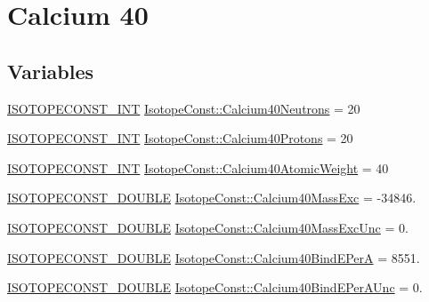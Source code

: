 \hypertarget{group___isotope_const-_calcium-_ca40}{}\section{Calcium 40}
\label{group___isotope_const-_calcium-_ca40}
\subsection*{Variables}
\begin{DoxyCompactItemize}
\item 
\mbox{\hyperlink{group___isotope_const-_macros_ga5f18360b3e99483a35c32d789e62621c}{I\+S\+O\+T\+O\+P\+E\+C\+O\+N\+S\+T\+\_\+\+I\+NT}} \mbox{\hyperlink{group___isotope_const-_calcium-_ca40_ga3960d94a6b2493802536466a374dfe0c}{Isotope\+Const\+::\+Calcium40\+Neutrons}} = 20
\item 
\mbox{\hyperlink{group___isotope_const-_macros_ga5f18360b3e99483a35c32d789e62621c}{I\+S\+O\+T\+O\+P\+E\+C\+O\+N\+S\+T\+\_\+\+I\+NT}} \mbox{\hyperlink{group___isotope_const-_calcium-_ca40_ga872fcb7995c634f64b32d61a42a71a38}{Isotope\+Const\+::\+Calcium40\+Protons}} = 20
\item 
\mbox{\hyperlink{group___isotope_const-_macros_ga5f18360b3e99483a35c32d789e62621c}{I\+S\+O\+T\+O\+P\+E\+C\+O\+N\+S\+T\+\_\+\+I\+NT}} \mbox{\hyperlink{group___isotope_const-_calcium-_ca40_ga2e5cabd8fe78b87970ab024e37f44fc2}{Isotope\+Const\+::\+Calcium40\+Atomic\+Weight}} = 40
\item 
\mbox{\hyperlink{group___isotope_const-_macros_ga8f45a7272ce02c0b4c65c44636ed719a}{I\+S\+O\+T\+O\+P\+E\+C\+O\+N\+S\+T\+\_\+\+D\+O\+U\+B\+LE}} \mbox{\hyperlink{group___isotope_const-_calcium-_ca40_ga1d5a467a09d61b43cd91f2252be3d392}{Isotope\+Const\+::\+Calcium40\+Mass\+Exc}} = -\/34846.
\item 
\mbox{\hyperlink{group___isotope_const-_macros_ga8f45a7272ce02c0b4c65c44636ed719a}{I\+S\+O\+T\+O\+P\+E\+C\+O\+N\+S\+T\+\_\+\+D\+O\+U\+B\+LE}} \mbox{\hyperlink{group___isotope_const-_calcium-_ca40_gae2b8902c43866d27c95ef455ad59b868}{Isotope\+Const\+::\+Calcium40\+Mass\+Exc\+Unc}} = 0.
\item 
\mbox{\hyperlink{group___isotope_const-_macros_ga8f45a7272ce02c0b4c65c44636ed719a}{I\+S\+O\+T\+O\+P\+E\+C\+O\+N\+S\+T\+\_\+\+D\+O\+U\+B\+LE}} \mbox{\hyperlink{group___isotope_const-_calcium-_ca40_ga0e00f4606627b6664d2946ed6d1b2995}{Isotope\+Const\+::\+Calcium40\+Bind\+E\+PerA}} = 8551.
\item 
\mbox{\hyperlink{group___isotope_const-_macros_ga8f45a7272ce02c0b4c65c44636ed719a}{I\+S\+O\+T\+O\+P\+E\+C\+O\+N\+S\+T\+\_\+\+D\+O\+U\+B\+LE}} \mbox{\hyperlink{group___isotope_const-_calcium-_ca40_gafada7c1eae21996b00e31d761993c73b}{Isotope\+Const\+::\+Calcium40\+Bind\+E\+Per\+A\+Unc}} = 0.

\end{DoxyCompactItemize}
